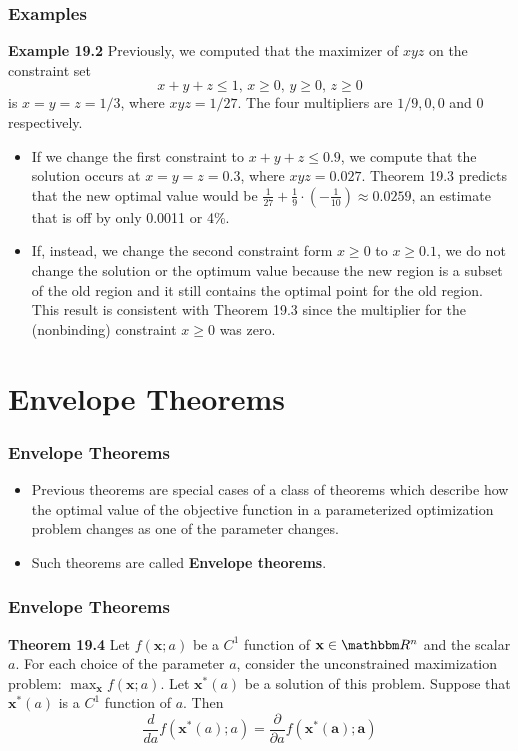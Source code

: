 \documentclass[9pt,aspectratio=169]{beamer}
\newcommand{\RR}{\mathbbm R}
\begin{document}
\begin{frame}
    \frametitle{Examples}

    \textbf{Example 19.2} Previously, we computed that the maximizer of $xyz$
    on the constraint set
    $$x+y+z\leq 1,\, x\geq 0,\, y\geq 0,\, z\geq 0$$
    is $x = y =z =1/3$, where $xyz = 1/27$. The four multipliers are
    $1/9, 0, 0$ and $0$ respectively.
    \begin{itemize}
        \item[(a)] If we change the first constraint to $x+y+z\leq0.9$, we
        compute that the solution occurs at $x = y = z = 0.3$, where $xyz =
        0.027$. Theorem 19.3 predicts that the new optimal value would be
        $\frac{1}{27} + \frac{1}{9} \cdot \left(-\frac{1}{10}\right) \approx
        0.0259$, an estimate that is off by only 0.0011 or 4\%.
        \item[(b)] If, instead, we change the second constraint form $x\geq0$
        to $x\geq0.1$, we do not change the solution or the optimum value
        because the new region is a subset of the old region and it still
        contains the optimal point for the old region. This result is
        consistent with Theorem 19.3 since the multiplier for the
        (nonbinding) constraint $x\geq0$ was zero.
    \end{itemize}
\end{frame}	

\section{Envelope Theorems}
\begin{frame}
	\frametitle{Envelope Theorems}
	\begin{itemize}
		\item Previous theorems are special cases of a class of theorems
        which describe how the optimal value of the objective function in a
        parameterized optimization problem changes as one of the parameter
        changes.
		\item Such theorems are called \textbf{Envelope theorems}.
	\end{itemize}
\end{frame}	


\begin{frame}
	\frametitle{Envelope Theorems}
	\begin{block}{\textbf{Theorem 19.4}}
        Let $f(\mathbf{x}; a)$ be a $C^1$ function of $\mathbf{x}\in \RR^n$
        and the scalar $a$. For each choice of the parameter $a$, consider
        the unconstrained maximization problem: $\max_{\mathbf x}
        f(\mathbf{x}; a)$. Let $\mathbf{x^*}(a)$ be a solution of this
        problem. Suppose that $\mathbf{x^*}(a)$ is a $C^1$ function of $a$.
        Then
        \begin{equation*}
            \frac{d}{da}f(\mathbf{x^*}(a); a) = \frac{\partial}{\partial
              a}f(\mathbf{x^*(a); a})
        \end{equation*}
	\end{block}
\end{frame}	
\end{document}
